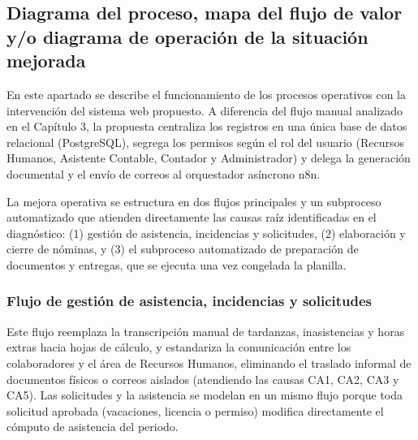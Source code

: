 \subsection{Diagrama del proceso, mapa del flujo de valor y/o diagrama de operación de la situación mejorada}

En este apartado se describe el funcionamiento de los procesos operativos con la intervención del sistema web propuesto. A diferencia del flujo manual analizado en el Capítulo 3,
la propuesta centraliza los registros en una única base de datos relacional (PostgreSQL),
segrega los permisos según el rol del usuario (Recursos Humanos, Asistente Contable, Contador y Administrador)
y delega la generación documental y el envío de correos al orquestador asíncrono n8n.

La mejora operativa se estructura en dos flujos principales y un subproceso automatizado que atienden directamente las causas raíz identificadas en el diagnóstico:
(1) gestión de asistencia, incidencias y solicitudes,
(2) elaboración y cierre de nóminas, y
(3) el subproceso automatizado de preparación de documentos y entregas, que se ejecuta una vez congelada la planilla.

\subsubsection{Flujo de gestión de asistencia, incidencias y solicitudes}

Este flujo reemplaza la transcripción manual de tardanzas, inasistencias y horas extras hacia hojas de cálculo, y estandariza la comunicación entre los colaboradores y el área de Recursos Humanos, eliminando el traslado informal de documentos físicos o correos aislados (atendiendo las causas CA1, CA2, CA3 y CA5). Las solicitudes y la asistencia se modelan en un mismo flujo porque toda solicitud aprobada (vacaciones, licencia o permiso) modifica directamente el cómputo de asistencia del periodo.

